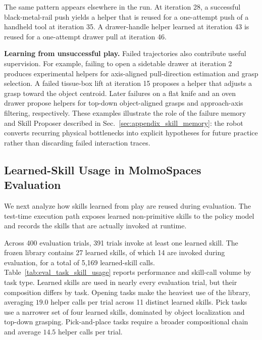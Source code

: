 \documentclass{llmxive}
\begin{document}
The same pattern appears elsewhere in the run. At iteration 28, a successful
black-metal-rail push yields a helper that is reused for a one-attempt push of
a handheld tool at iteration 35. A drawer-handle helper learned at iteration
43 is reused for a one-attempt drawer pull at iteration 46.

\textbf{Learning from unsuccessful play.}
Failed trajectories also contribute useful supervision. For example, failing to
open a sidetable drawer at iteration 2 produces experimental helpers for
axis-aligned pull-direction estimation and grasp selection. A failed tissue-box
lift at iteration 15 proposes a helper that adjusts a grasp toward the object
centroid. Later failures on a flat knife and an oven drawer propose helpers
for top-down object-aligned grasps and approach-axis filtering, respectively.
These examples illustrate the role of the failure memory and Skill Proposer
described in Sec.~\ref{sec:appendix_skill_memory}: the robot converts recurring
physical bottlenecks into explicit hypotheses for future practice rather than
discarding failed interaction traces.

\subsection{Learned-Skill Usage in MolmoSpaces Evaluation}
\label{sec:appendix_molmospaces_skill_usage}

We next analyze how skills learned from play are reused during evaluation. The test-time execution path
exposes learned non-primitive skills to the policy model and records the
skills that are actually invoked at runtime.

Across 400 evaluation trials, 391 trials invoke at least one learned skill.
The frozen library contains 27 learned skills, of which 14 are invoked during
evaluation, for a total of 5,169 learned-skill calls. Table~\ref{tab:eval_task_skill_usage}
reports performance and skill-call volume by task type. Learned skills are
used in nearly every evaluation trial, but their composition differs by task.
Opening tasks make the heaviest use of the library, averaging $19.0$ helper
calls per trial across 11 distinct learned skills. Pick tasks use a narrower
set of four learned skills, dominated by object localization and top-down grasping.
Pick-and-place tasks require a broader compositional chain and average $14.5$
helper calls per trial.
\end{document}
